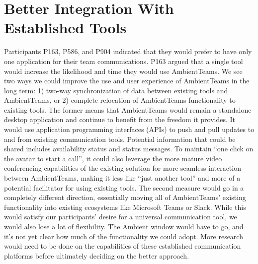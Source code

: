 \section{Better Integration With Established Tools}
\label{section:better_integration_with_established_tools}
Participants P163, P586, and P904 indicated that they would prefer to have only one application for their team communications. P163 argued that a single tool would increase the likelihood and time they would use AmbientTeams. We see two ways we could improve the use and user experience of AmbientTeams in the long term: 1) two-way synchronization of data between existing tools and AmbientTeams, or 2) complete relocation of AmbientTeams functionality to existing tools. The former means that AmbientTeams would remain a standalone desktop application and continue to benefit from the freedom it provides. It would use application programming interfaces (APIs) to push and pull updates to and from existing communication tools. Potential information that could be shared includes availability status and status messages. To maintain \enquote{one click on the avatar to start a call}, it could also leverage the more mature video conferencing capabilities of the existing solution for more seamless interaction between AmbientTeams, making it less like \enquote{just another tool} and more of a potential facilitator for using existing tools. The second measure would go in a completely different direction, essentially moving all of AmbientTeams' existing functionality into existing ecosystems like Microsoft Teams or Slack. While this would satisfy our participants' desire for a universal communication tool, we would also lose a lot of flexibility. The Ambient window would have to go, and it's not yet clear how much of the functionality we could adopt. More research would need to be done on the capabilities of these established communication platforms before ultimately deciding on the better approach.

